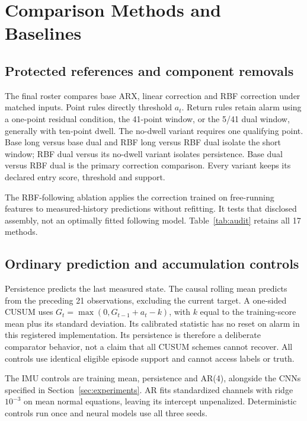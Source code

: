 \section{Comparison Methods and Baselines}\label{sec:comparators}
\subsection{Protected references and component removals}
The final roster compares base ARX, linear correction and RBF correction under matched inputs. Point rules directly threshold $a_t$. Return rules retain alarm using a one-point residual condition, the 41-point window, or the 5/41 dual window, generally with ten-point dwell. The no-dwell variant requires one qualifying point. Base long versus base dual and RBF long versus RBF dual isolate the short window; RBF dual versus its no-dwell variant isolates persistence. Base dual versus RBF dual is the primary correction comparison. Every variant keeps its declared entry score, threshold and support.

The RBF-following ablation applies the correction trained on free-running features to measured-history predictions without refitting. It tests that disclosed assembly, not an optimally fitted following model. Table~\ref{tab:audit} retains all 17 methods.

\subsection{Ordinary prediction and accumulation controls}
Persistence predicts the last measured state. The causal rolling mean predicts from the preceding 21 observations, excluding the current target. A one-sided CUSUM uses $G_t=\max(0,G_{t-1}+a_t-k)$, with $k$ equal to the training-score mean plus its standard deviation. Its calibrated statistic has no reset on alarm in this registered implementation. Its persistence is therefore a deliberate comparator behavior, not a claim that all CUSUM schemes cannot recover. All controls use identical eligible episode support and cannot access labels or truth.

The IMU controls are training mean, persistence and AR(4), alongside the CNNs specified in Section~\ref{sec:experiments}. AR fits standardized channels with ridge $10^{-3}$ on mean normal equations, leaving its intercept unpenalized. Deterministic controls run once and neural models use all three seeds.


